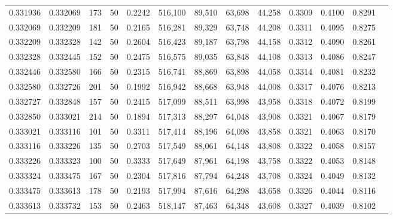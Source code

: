\begin{tabular}{rrrrrrrrrrrrr}
0.331936 & 0.332069 &   173 &  50 &                                     0.2242 & 516,100 &  89,510 &  63,698 &  44,258 & 0.3309 & 0.4100 & 0.8291 \\
0.332069 & 0.332209 &   181 &  50 &                                     0.2165 & 516,281 &  89,329 &  63,748 &  44,208 & 0.3311 & 0.4095 & 0.8275 \\
0.332209 & 0.332328 &   142 &  50 &                                     0.2604 & 516,423 &  89,187 &  63,798 &  44,158 & 0.3312 & 0.4090 & 0.8261 \\
0.332328 & 0.332445 &   152 &  50 &                                     0.2475 & 516,575 &  89,035 &  63,848 &  44,108 & 0.3313 & 0.4086 & 0.8247 \\
0.332446 & 0.332580 &   166 &  50 &                                     0.2315 & 516,741 &  88,869 &  63,898 &  44,058 & 0.3314 & 0.4081 & 0.8232 \\
0.332580 & 0.332726 &   201 &  50 &                                     0.1992 & 516,942 &  88,668 &  63,948 &  44,008 & 0.3317 & 0.4076 & 0.8213 \\
0.332727 & 0.332848 &   157 &  50 &                                     0.2415 & 517,099 &  88,511 &  63,998 &  43,958 & 0.3318 & 0.4072 & 0.8199 \\
0.332850 & 0.333021 &   214 &  50 &                                     0.1894 & 517,313 &  88,297 &  64,048 &  43,908 & 0.3321 & 0.4067 & 0.8179 \\
0.333021 & 0.333116 &   101 &  50 &                                     0.3311 & 517,414 &  88,196 &  64,098 &  43,858 & 0.3321 & 0.4063 & 0.8170 \\
0.333116 & 0.333226 &   135 &  50 &                                     0.2703 & 517,549 &  88,061 &  64,148 &  43,808 & 0.3322 & 0.4058 & 0.8157 \\
0.333226 & 0.333323 &   100 &  50 &                                     0.3333 & 517,649 &  87,961 &  64,198 &  43,758 & 0.3322 & 0.4053 & 0.8148 \\
0.333324 & 0.333475 &   167 &  50 &                                     0.2304 & 517,816 &  87,794 &  64,248 &  43,708 & 0.3324 & 0.4049 & 0.8132 \\
0.333475 & 0.333613 &   178 &  50 &                                     0.2193 & 517,994 &  87,616 &  64,298 &  43,658 & 0.3326 & 0.4044 & 0.8116 \\
0.333613 & 0.333732 &   153 &  50 &                                     0.2463 & 518,147 &  87,463 &  64,348 &  43,608 & 0.3327 & 0.4039 & 0.8102 \\

\end{tabular}
